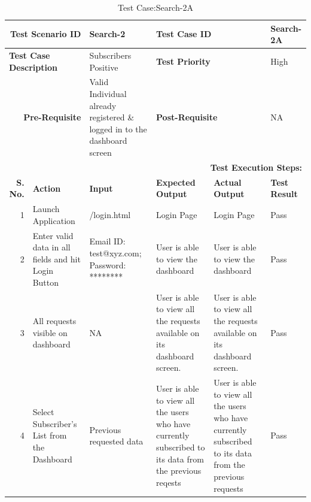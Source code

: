 \documentclass[a4paper, hidelinks, 12pt]{report}
\begin{document}
\begin{itemize}
\begin{table}[H]
  \centering
  \caption{Test Case:Search-2A}
    \begin{tabular}{|r|p{4.355em}|p{7.715em}|p{6.43em}|p{5.855em}|p{5.07em}|}
    \toprule
    \multicolumn{2}{|p{13.425em}|}{\textbf{Test Scenario ID}} & Search-2 & \multicolumn{2}{p{12.285em}|}{\textbf{Test Case ID}} & Search-2A \\
    \midrule
    \multicolumn{2}{|l|}{\multirow{2}[2]{*}{\textbf{Test Case Description}}} & \multirow{2}[2]{*}{Subscribers Positive} & \multicolumn{2}{l|}{\multirow{2}[2]{*}{\textbf{Test Priority}}} & \multirow{2}[2]{*}{High} \\
    \multicolumn{2}{|l|}{} & \multicolumn{1}{l|}{} & \multicolumn{2}{l|}{} & \multicolumn{1}{l|}{} \\
    \midrule
    \multicolumn{2}{|p{13.425em}|}{\textbf{Pre-Requisite}} & Valid Individual already registered \& logged in to the dashboard screen & \multicolumn{2}{p{12.285em}|}{\textbf{Post-Requisite}} & NA \\
    \midrule
    \multicolumn{6}{p{38.495em}|}{\textbf{Test Execution Steps:}} \\
    \midrule
    \multicolumn{1}{|p{5.07em}|}{\textbf{S. No.}} & \textbf{Action } & \textbf{Input} & \textbf{Expected Output} & \textbf{Actual Output} & \textbf{Test Result} \\
    \midrule
    1     & Launch Application & /login.html & Login Page & Login Page & Pass \\
    \midrule
    2     & Enter valid data in all fields and hit Login Button & Email ID: test@xyz.com; Password: ******** & User is able to view the dashboard & User is able to view the dashboard & Pass \\
    \midrule
    3     & All requests visible on dashboard & NA    & User is able to view all the requests available on its dashboard screen. & User is able to view all the requests available on its dashboard screen. & Pass \\
    \midrule
    4     & Select Subscriber's List from the Dashboard & Previous requested data & User is able to view all the users who have currently subscribed to its data from the previous reqests & User is able to view all the users who have currently subscribed to its data from the previous requests & Pass \\
    \bottomrule
    \end{tabular}%
  \label{tab:Test Case:Search-2A}%
\end{table}%


\end{itemize}
\end{document}
